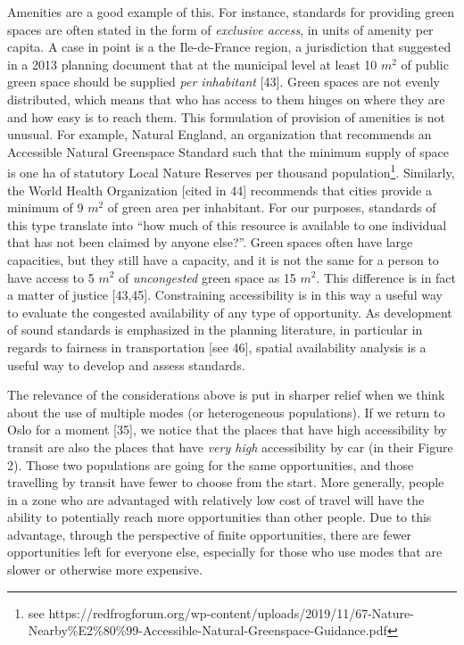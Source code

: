 \documentclass[10pt,letterpaper]{article}
\begin{document}
Amenities are a good example of this. For instance, standards for
providing green spaces are often stated in the form of \emph{exclusive
access}, in units of amenity per capita. A case in point is a the
Ile-de-France region, a jurisdiction that suggested in a 2013 planning
document that at the municipal level at least 10 \(m^2\) of public green
space should be supplied \emph{per inhabitant} {[}43{]}. Green spaces
are not evenly distributed, which means that who has access to them
hinges on where they are and how easy is to reach them. This formulation
of provision of amenities is not unusual. For example, Natural England,
an organization that recommends an Accessible Natural Greenspace
Standard such that the minimum supply of space is one ha of statutory
Local Nature Reserves per thousand population\footnote{see
  https://redfrogforum.org/wp-content/uploads/2019/11/67-Nature-Nearby\%E2\%80\%99-Accessible-Natural-Greenspace-Guidance.pdf}.
Similarly, the World Health Organization {[}cited in 44{]} recommends
that cities provide a minimum of 9 \(m^2\) of green area per inhabitant.
For our purposes, standards of this type translate into ``how much of
this resource is available to one individual that has not been claimed
by anyone else?''. Green spaces often have large capacities, but they
still have a capacity, and it is not the same for a person to have
access to 5 \(m^2\) of \emph{uncongested} green space as 15 \(m^2\).
This difference is in fact a matter of justice {[}43,45{]}. Constraining
accessibility is in this way a useful way to evaluate the congested
availability of any type of opportunity. As development of sound
standards is emphasized in the planning literature, in particular in
regards to fairness in transportation {[}see 46{]}, spatial availability
analysis is a useful way to develop and assess standards.

The relevance of the considerations above is put in sharper relief when
we think about the use of multiple modes (or heterogeneous populations).
If we return to Oslo for a moment {[}35{]}, we notice that the places
that have high accessibility by transit are also the places that have
\emph{very high} accessibility by car (in their Figure 2). Those two
populations are going for the same opportunities, and those travelling
by transit have fewer to choose from the start. More generally, people
in a zone who are advantaged with relatively low cost of travel will
have the ability to potentially reach more opportunities than other
people. Due to this advantage, through the perspective of finite
opportunities, there are fewer opportunities left for everyone else,
especially for those who use modes that are slower or otherwise more
expensive.
\end{document}
